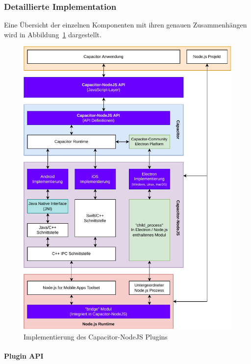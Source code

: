 \subsubsection{Detaillierte Implementation}

Eine Übersicht der einzelnen Komponenten mit ihren genauen Zusammenhängen wird in Abbildung~\ref{asset:Capacitor-NodeJS:Implementation} dargestellt.

\begin{figure}[H]
    \centering
    \vspace{1em}
    \includegraphics[width=\textwidth]{assets/02_Capacitor-NodeJS/04_Implementation.drawio.pdf}
    \caption[Capacitor-NodeJS / Implementierung]{Implementierung des Capacitor-NodeJS Plugins}
    \label{asset:Capacitor-NodeJS:Implementation}
\end{figure}

\newpage

\paragraph{Plugin API}

